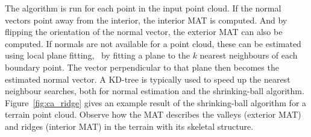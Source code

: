The algorithm is run for each point in the input point cloud. 
If the normal vectors point away from the interior, the interior MAT is computed.
And by flipping the orientation of the normal vector, the exterior MAT can also be computed.
If normals are not available for a point cloud, these can be estimated using local plane fitting, \ie\ by fitting a plane to the $k$ nearest neighbours of each boundary point. 
The vector perpendicular to that plane then becomes the estimated normal vector.
A KD-tree is typically used to speed up the nearest neighbour searches, both for normal estimation and the shrinking-ball algorithm.
Figure~\ref{fig:ca_ridge} gives an example result of the shrinking-ball algorithm for a terrain point cloud. 
Observe how the MAT describes the valleys (exterior MAT) and ridges (interior MAT) in the terrain with its skeletal structure.
